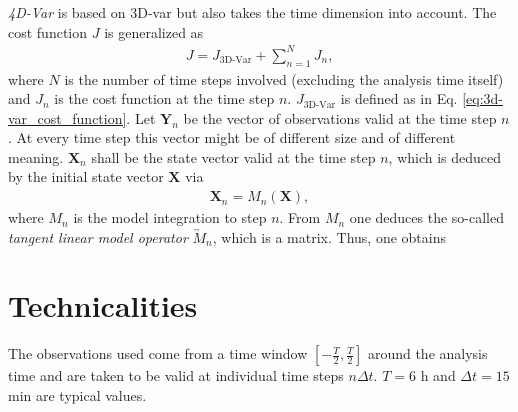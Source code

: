 \documentclass{report}
\begin{document}
\textit{4D-Var} is based on 3D-var but also takes the time dimension into account. The cost function $J$ is generalized as
%
\begin{eqnarray}
J = J_{\text{3D-Var}} + \sum_{n = 1}^NJ_n,
\end{eqnarray}
%
where $N$ is the number of time steps involved (excluding the analysis time itself) and $J_n$ is the cost function at the time step $n$. $J_{\text{3D-Var}}$ is defined as in Eq. \eqref{eq:3d-var_cost_function}. Let $\mathbf{Y}_n$ be the vector of observations valid at the time step $n$. At every time step this vector might be of different size and of different meaning. $\mathbf{X}_n$ shall be the state vector valid at the time step $n$, which is deduced by the initial state vector $\mathbf{X}$ via
%
\begin{eqnarray}
\mathbf{X}_n = M_n\left(\mathbf{X}\right),
\end{eqnarray}
%
where $M_n$ is the model integration to step $n$. From $M_n$ one deduces the so-called \textit{tangent linear model operator} $\overleftrightarrow{M}_n$, which is a matrix. Thus, one obtains
%
\begin{center}
\end{center}
%

\section{Technicalities}
\label{sec:technicalities_4d-var}

The observations used come from a time window $\left[-\frac{T}{2}, \frac{T}{2}\right]$ around the analysis time and are taken to be valid at individual time steps $n\Delta t$. $T = 6$ h and $\Delta t = 15$ min are typical values.

\appendix

\printbibliography
\end{document}
